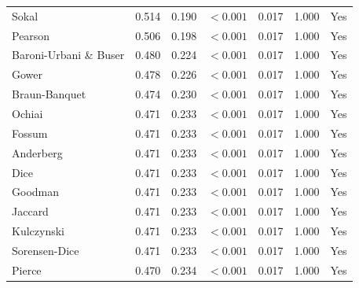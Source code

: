 \begin{table}[t]
{\begin{tabular}{lrrrrrc}
Sokal & 0.514 & 0.190 & $<0.001$ & 0.017 & 1.000 & Yes \\
Pearson & 0.506 & 0.198 & $<0.001$ & 0.017 & 1.000 & Yes \\
Baroni-Urbani \& Buser & 0.480 & 0.224 & $<0.001$ & 0.017 & 1.000 & Yes \\
Gower & 0.478 & 0.226 & $<0.001$ & 0.017 & 1.000 & Yes \\
Braun-Banquet & 0.474 & 0.230 & $<0.001$ & 0.017 & 1.000 & Yes \\
Ochiai & 0.471 & 0.233 & $<0.001$ & 0.017 & 1.000 & Yes \\
Fossum & 0.471 & 0.233 & $<0.001$ & 0.017 & 1.000 & Yes \\
Anderberg & 0.471 & 0.233 & $<0.001$ & 0.017 & 1.000 & Yes \\
Dice & 0.471 & 0.233 & $<0.001$ & 0.017 & 1.000 & Yes \\
Goodman & 0.471 & 0.233 & $<0.001$ & 0.017 & 1.000 & Yes \\
Jaccard & 0.471 & 0.233 & $<0.001$ & 0.017 & 1.000 & Yes \\
Kulczynski & 0.471 & 0.233 & $<0.001$ & 0.017 & 1.000 & Yes \\
Sorensen-Dice & 0.471 & 0.233 & $<0.001$ & 0.017 & 1.000 & Yes \\
Pierce & 0.470 & 0.234 & $<0.001$ & 0.017 & 1.000 & Yes \\
\bottomrule
\end{tabular}
}
\end{table}
